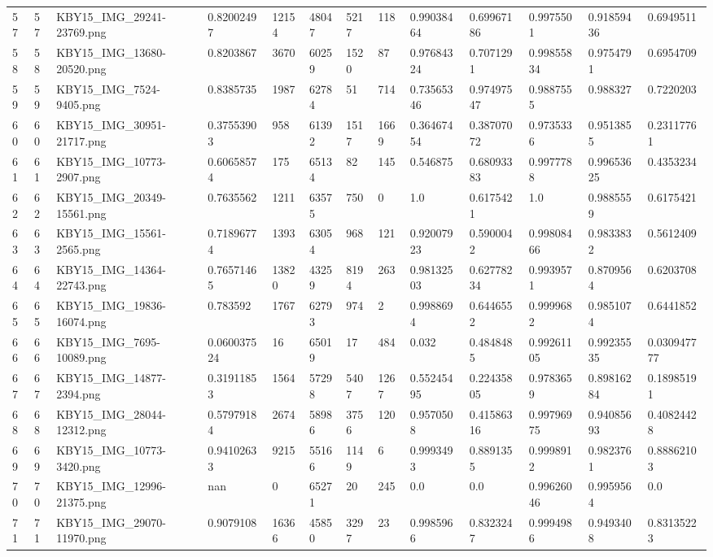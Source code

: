 \documentclass[11pt, a4paper, twoside]{report}
\begin{document}
\begin{longtable}[c]{@{}lllllllllllll@{}}
57 & 57 & KBY15\_IMG\_29241-23769.png & 0.82002497 & 12154 & 48047 & 5217 & 118 & 0.99038464 & 0.69967186 & 0.9975501 & 0.91859436 & 0.6949511 \\
58 & 58 & KBY15\_IMG\_13680-20520.png & 0.8203867 & 3670 & 60259 & 1520 & 87 & 0.97684324 & 0.7071291 & 0.99855834 & 0.9754791 & 0.6954709 \\
59 & 59 & KBY15\_IMG\_7524-9405.png & 0.8385735 & 1987 & 62784 & 51 & 714 & 0.73565346 & 0.97497547 & 0.9887555 & 0.988327 & 0.7220203 \\
60 & 60 & KBY15\_IMG\_30951-21717.png & 0.37553903 & 958 & 61392 & 1517 & 1669 & 0.36467454 & 0.38707072 & 0.9735336 & 0.9513855 & 0.23117761 \\
61 & 61 & KBY15\_IMG\_10773-2907.png & 0.60658574 & 175 & 65134 & 82 & 145 & 0.546875 & 0.68093383 & 0.9977788 & 0.99653625 & 0.4353234 \\
62 & 62 & KBY15\_IMG\_20349-15561.png & 0.7635562 & 1211 & 63575 & 750 & 0 & 1.0 & 0.6175421 & 1.0 & 0.9885559 & 0.6175421 \\
63 & 63 & KBY15\_IMG\_15561-2565.png & 0.71896774 & 1393 & 63054 & 968 & 121 & 0.92007923 & 0.5900042 & 0.99808466 & 0.9833832 & 0.5612409 \\
64 & 64 & KBY15\_IMG\_14364-22743.png & 0.76571465 & 13820 & 43259 & 8194 & 263 & 0.98132503 & 0.62778234 & 0.9939571 & 0.8709564 & 0.6203708 \\
65 & 65 & KBY15\_IMG\_19836-16074.png & 0.783592 & 1767 & 62793 & 974 & 2 & 0.9988694 & 0.6446552 & 0.9999682 & 0.9851074 & 0.6441852 \\
66 & 66 & KBY15\_IMG\_7695-10089.png & 0.060037524 & 16 & 65019 & 17 & 484 & 0.032 & 0.4848485 & 0.99261105 & 0.99235535 & 0.030947777 \\
67 & 67 & KBY15\_IMG\_14877-2394.png & 0.31911853 & 1564 & 57298 & 5407 & 1267 & 0.55245495 & 0.22435805 & 0.9783659 & 0.89816284 & 0.18985191 \\
68 & 68 & KBY15\_IMG\_28044-12312.png & 0.57979184 & 2674 & 58986 & 3756 & 120 & 0.9570508 & 0.41586316 & 0.99796975 & 0.94085693 & 0.40824428 \\
69 & 69 & KBY15\_IMG\_10773-3420.png & 0.94102633 & 9215 & 55166 & 1149 & 6 & 0.9993493 & 0.8891355 & 0.9998912 & 0.9823761 & 0.88862103 \\
70 & 70 & KBY15\_IMG\_12996-21375.png & nan & 0 & 65271 & 20 & 245 & 0.0 & 0.0 & 0.99626046 & 0.9959564 & 0.0 \\
71 & 71 & KBY15\_IMG\_29070-11970.png & 0.9079108 & 16366 & 45850 & 3297 & 23 & 0.9985966 & 0.8323247 & 0.9994986 & 0.9493408 & 0.83135223 \\

\end{longtable}
\end{document}
